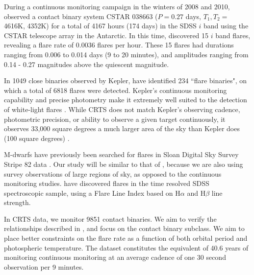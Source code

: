 \documentclass[12pt]{article} %
\numberwithin{equation}{section} %
\begin{document}
During a continuous monitoring campaign in the winters of 2008 and 2010, \citet{qian2014optical} observed a contact binary system CSTAR 038663 ($P = 0.27$ days, $T_{1}, T_{2} =$ 4616K, 4352K) for a total of 4167 hours (174 days) in the SDSS $i$ band using the CSTAR telescope array in the Antarctic. In this time, \citet{qian2014optical} discovered 15 $i$ band flares, revealing a flare rate of $0.0036$ flares per hour. These 15 flares had durations ranging from 0.006 to 0.014 days (9 to 20 minutes), and amplitudes ranging from 0.14 - 0.27 magnitudes above the quiescent magnitude.

In 1049 close binaries observed by Kepler, \citet{gao2016white} have identified 234 ``flare binaries", on which a total of 6818 flares were detected. Kepler's continuous monitoring capability and precise photometry make it extremely well suited to the detection of white-light flares \citep{walkowicz2011white}. While CRTS does not match Kepler's observing cadence, photometric precision, or ability to observe a given target continuously, it observes 33,000 square degrees a much larger area of the sky than Kepler does (100 square degrees) \citep{drake2009first, basri2005kepler}.

M-dwarfs have previously been searched for flares in Sloan Digital Sky Survey Stripe 82 data \citep{kowalski2009m}. Our study will be similar to that of \citet{kowalski2009m}, because we are also using survey observations of large regions of sky, as opposed to the continuous monitoring studies. \citet{hilton2010m} have discovered flares in the time resolved SDSS spectroscopic sample, using a Flare Line Index based on H$\alpha$ and H$\beta$ line strength.

In CRTS data, we monitor 9851 contact binaries. We aim to verify the relationships described in \citet{gao2016white}, and focus on the contact binary subclass.
We aim to place better constraints on the flare rate as a function of both orbital period and photospheric temperature. The dataset constitutes the equivalent of 40.6 years of monitoring continuous monitoring at an average cadence of one 30 second observation per 9 minutes. 




\end{document}

